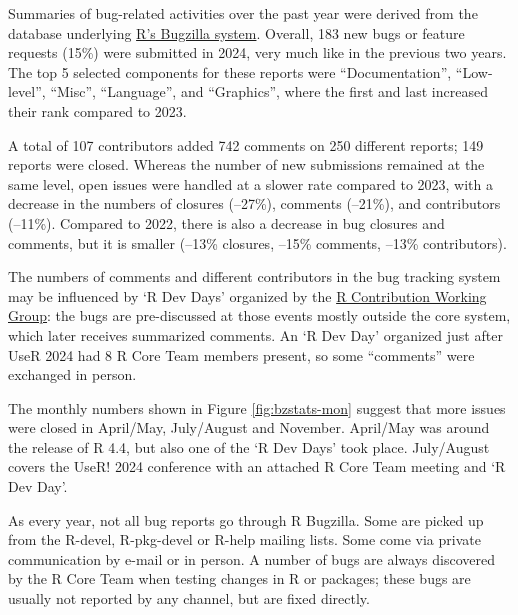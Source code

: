 Summaries of bug-related activities over the past year were derived from the
database underlying \href{https://bugs.R-project.org/}{R's Bugzilla system}.
Overall, 183 new bugs or feature requests (15\%) were submitted in 2024,
very much like in the previous two years.
The top 5 selected components for these reports were
``Documentation'', ``Low-level'', ``Misc'', ``Language'', and ``Graphics'',
where the first and last increased their rank compared to 2023.

A total of 107 contributors added 742 comments on 250 different reports; 149
reports were closed. Whereas the number of new submissions remained at
the same level, open issues were handled at a slower rate compared to 2023,
with a decrease in the numbers of closures (--27\%), comments (--21\%), and
contributors (--11\%). Compared to 2022, there is also a decrease in bug
closures and comments, but it is smaller (--13\% closures, --15\% comments,
--13\% contributors).

The numbers of comments and different contributors in the bug tracking system
may be influenced by `R Dev Days' organized by the \href{https://contributor.R-project.org/}{R Contribution Working
Group}: the bugs are pre-discussed at
those events mostly outside the core system, which later receives summarized
comments. An `R Dev Day' organized just after
UseR 2024 had 8 R Core Team members present, so some ``comments'' were exchanged
in person.

The monthly numbers shown in Figure \ref{fig:bzstats-mon} suggest that more
issues were closed in April/May, July/August and November. April/May was
around the release of R 4.4, but also one of the `R Dev Days' took place.
July/August covers the UseR! 2024 conference with an attached R Core Team
meeting and `R Dev Day'.

As every year, not all bug reports go through R Bugzilla. Some are picked
up from the R-devel, R-pkg-devel or R-help mailing lists. Some come via
private communication by e-mail or in person. A number of bugs are always
discovered by the R Core Team when testing changes in R or packages; these
bugs are usually not reported by any channel, but are fixed directly.

